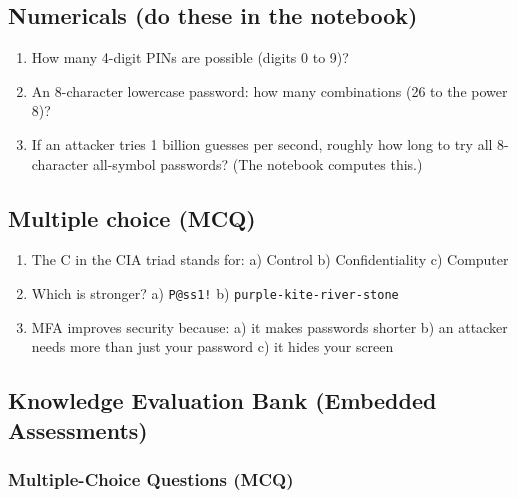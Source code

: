 \documentclass[12pt,openany]{book}
\begin{document}
\medskip

\subsection*{Numericals (do these in the notebook)}


\begin{enumerate}

  \item How many 4-digit PINs are possible (digits 0 to 9)?

  \item An 8-character lowercase password: how many combinations (26 to the power 8)?

  \item If an attacker tries 1 billion guesses per second, roughly how long to try all 8-character all-symbol passwords? (The notebook computes this.)

\end{enumerate}

\medskip

\subsection*{Multiple choice (MCQ)}


\begin{enumerate}

  \item The C in the CIA triad stands for:
   a) Control  b) Confidentiality  c) Computer

  \item Which is stronger?
   a) \texttt{P@ss1!}  b) \texttt{purple-kite-river-stone}

  \item MFA improves security because:
   a) it makes passwords shorter  b) an attacker needs more than just your password  c) it hides your screen

\end{enumerate}

\medskip

\subsection*{Knowledge Evaluation Bank (Embedded Assessments)}


\subsubsection*{Multiple-Choice Questions (MCQ)}
\end{document}
